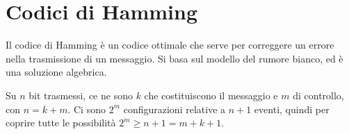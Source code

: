\section{Codici di Hamming}
Il codice di Hamming è un codice ottimale che serve per correggere un errore nella trasmissione di un messaggio. Si basa sul modello del rumore bianco, ed è una soluzione algebrica.

Su $n$ bit trasmessi, ce ne sono $k$ che costituiscono il messaggio e $m$ di controllo, con $n = k + m$. Ci sono $2^m$ configurazioni relative a $n + 1$ eventi, quindi per coprire tutte le possibilità $2^m \geq n + 1 = m + k + 1$.



